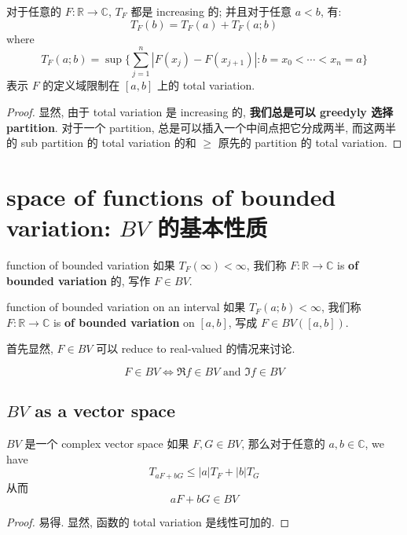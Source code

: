 \documentclass[lang=cn,11pt]{elegantbook}
\begin{document}
\begin{lemma}
 对于任意的 $F:\mathbb{R}\to \mathbb{C}$,  $T_F$ 都是 increasing 的; 并且对于任意 $a<b$, 有: \[
 T_F(b) =  T_F(a) + T_F(a;b)
 \]
 where \[
 T_F (a;b) = \sup\{\sum_{j=1}^n  | F(x_j) - F(x_{j+1})| : b =  x_0 < \cdots < x_n  = a \}
 \]
表示 $F$ 的定义域限制在 $[a,b]$ 上的 total variation. 
\end{lemma}
\begin{proof}
    显然, 由于 total variation 是 increasing 的,  \textbf{我们总是可以 greedyly 选择 partition}. 对于一个 partition, 总是可以插入一个中间点把它分成两半, 而这两半的 sub partition 的 total variation 的和 $\geq$ 原先的 partition 的 total variation.
\end{proof}

\section{space of functions of bounded variation: $BV$ 的基本性质 }

\begin{definition}{function of bounded variation}
 如果 $T_F(\infty) < \infty$, 我们称 $F:\mathbb{R}\to \mathbb{C}$ is \textbf{of bounded variation} 的, 写作 $F \in BV$.
\end{definition}

\begin{definition}{function of bounded variation on an interval}
如果 $T_F(a;b) < \infty$,  我们称 $F:\mathbb{R}\to \mathbb{C}$ is \textbf{of bounded variation} on $[a,b]$, 写成 $F \in BV([a,b])$.
\end{definition}

首先显然, $F\in BV$ 可以 reduce to real-valued 的情况来讨论.
\begin{proposition}\[
    F \in BV \iff \Re f \in BV \text{ and } \Im f \in BV
    \]
\end{proposition}


\subsection{$BV$ as a vector space }

\begin{lemma}{$BV$ 是一个 complex vector space}
    如果 $F,G \in BV$, 那么对于任意的 $a,b\in \mathbb{C}$, we have \[ T_{aF + bG}  \leq |a| T_F + |b| T_G   \]
    从而$$aF + bG \in BV$$
\end{lemma}
\begin{proof}
易得. 显然, 函数的 total variation 是线性可加的.
\end{proof}
\end{document}
